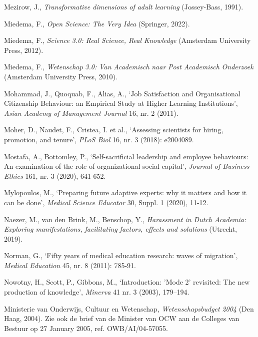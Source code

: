 \documentclass[smallauthor, chapterhaspagenum, nochapterinheader, pagenuminheader,  bigchapnum,medium2, tocpages, garamond, titleinheader]{jote-book}
\begin{document}
\begin{references}
		Mezirow, J., \emph{Transformative dimensions of adult learning} (Jossey-Bass, 1991).



		Miedema, F., \emph{Open Science: The Very Idea} (Springer, 2022).



		Miedema, F., \emph{Science 3.0: Real Science, Real Knowledge} (Amsterdam University Press, 2012).



		Miedema, F., \emph{Wetenschap}\emph{ 3.0: Van }\emph{Academisch}\emph{ }\emph{naar}\emph{ Post }\emph{Academisch}\emph{ }\emph{Onderzoek} (Amsterdam University Press, 2010).



		Mohammad, J., Quoquab, F., Alias, A., ‘Job Satisfaction and Organisational Citizenship Behaviour: an Empirical Study at Higher Learning Institutions', \emph{Asian Academy of Management Journal} 16, nr. 2 (2011).



		Moher, D., Naudet, F., Cristea, I. et al., ‘Assessing scientists for hiring, promotion, and tenure', \emph{PLoS Biol} 16, nr. 3 (2018): e2004089.



		Mostafa, A., Bottomley, P., ‘Self-sacrificial leadership and employee behaviours: An examination of the role of organizational social capital', \emph{Journal of Business Ethics} 161, nr. 3 (2020), 641-652.



		Mylopoulos, M., ‘Preparing future adaptive experts: why it matters and how it can be done', \emph{Medical Science Educator} 30, Suppl. 1 (2020), 11-12.



		Naezer, M., van den Brink, M., Benschop, Y., \emph{Harassment in Dutch Academia: Exploring manifestations, facilitating factors, effects and solutions} (Utrecht, 2019).



		Norman, G., ‘Fifty years of medical education research: waves of migration', \emph{Medical Education} 45, nr. 8 (2011): 785-91.



		Nowotny, H., Scott, P., Gibbons, M., ‘Introduction: 'Mode 2' revisited: The new production of knowledge', \emph{Minerva} 41 nr. 3 (2003), 179--194.



		Ministerie van Onderwijs, Cultuur en Wetenschap, \emph{Wetenschapsbudget}\emph{ 2004} (Den Haag, 2004). Zie ook de brief van de Minister van OCW aan de Colleges van Bestuur op 27 January 2005, ref. OWB/AI/04-57055.




\end{references}
\end{document}
